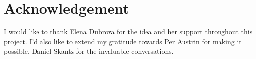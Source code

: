 \documentclass[conference]{IEEEtran}
\begin{document}
\section*{Acknowledgement}

I would like to thank Elena Dubrova for the idea and her support throughout this project. I'd also like to extend my gratitude towards Per Austrin for making it possible. Daniel Skantz for the invaluable conversations.



\nocite{*}
\end{document}
